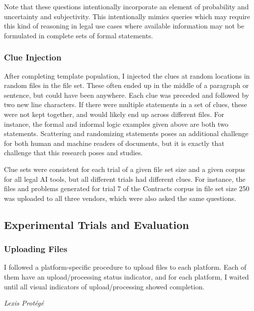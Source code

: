 \documentclass[
]{article}
\begin{document}
Note that these questions intentionally incorporate an element of probability and uncertainty and subjectivity. This intentionally mimics queries which may require this kind of reasoning in legal use cases where available information may not be formulated in complete sets of formal statements.

\subsubsection{Clue Injection}\label{clue-injection}

After completing template population, I injected the clues at random locations in random files in the file set. These often ended up in the middle of a paragraph or sentence, but could have been anywhere. Each clue was preceded and followed by two new line characters. If there were multiple statements in a set of clues, these were not kept together, and would likely end up across different files. For instance, the formal and informal logic examples given above are both two statements. Scattering and randomizing statements poses an additional challenge for both human and machine readers of documents, but it is exactly that challenge that this research poses and studies.

Clue sets were consistent for each trial of a given file set size and a given corpus for all legal AI tools, but all different trials had different clues. For instance, the files and problems generated for trial 7 of the Contracts corpus in file set size 250 was uploaded to all three vendors, which were also asked the same questions.

\subsection{Experimental Trials and Evaluation}\label{experimental-trials-and-evaluation}

\subsubsection{Uploading Files}\label{uploading-files}

I followed a platform-specific procedure to upload files to each platform. Each of them have an upload/processing status indicator, and for each platform, I waited until all visual indicators of upload/processing showed completion.

\emph{Lexis Protégé}
\end{document}

